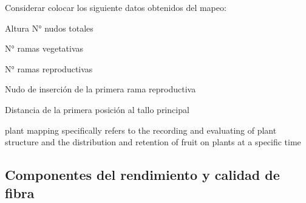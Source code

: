 \documentclass[12pt,oneside]{reedthesis}
\begin{document}
Considerar colocar los siguiente datos obtenidos del mapeo:

Altura N° nudos totales

N° ramas vegetativas

N° ramas reproductivas

Nudo de inserción de la primera rama reproductiva

Distancia de la primera posición al tallo principal

plant mapping specifically refers to the recording and evaluating of plant structure and the distribution and retention of fruit on plants at a specific time \autocite{kerby2010}

\subsection{Componentes del rendimiento y calidad de fibra}\label{componentes-del-rendimiento-y-calidad-de-fibra}
\end{document}
